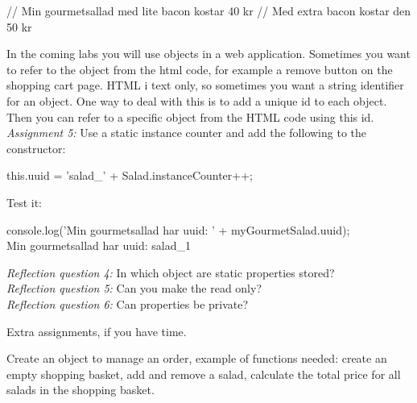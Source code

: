 \documentclass[fleqn, article, a4paper]{memoir}
\begin{document}
\begin{Assignments}
\begin{Code}
// Min gourmetsallad med lite bacon kostar 40 kr
// Med extra bacon kostar den 50 kr
\end{Code}

\item In the coming labs you will use  objects in a web application. Sometimes you want to refer to the object from the html code, for example a remove button on the shopping cart page. HTML i text only, so sometimes you want a string identifier for an object. One way to deal with this is to add a unique id to each  object. Then you can refer to a specific object from the HTML code using this id. 
\\\emph{Assignment 5:}
Use a static instance counter and add the following to the  constructor:
\begin{Code}
    this.uuid = 'salad_' + Salad.instanceCounter++;
\end{Code}
Test it:
\begin{Code}
console.log('Min gourmetsallad har uuid: ' + myGourmetSalad.uuid);
\\ Min gourmetsallad har uuid: salad_1
\end{Code}
\emph{Reflection question 4:} In which object are static properties stored?
\\\emph{Reflection question 5:} Can you make the  read only?
\\\emph{Reflection question 6:} Can properties be private?

\end{Assignments}

\noindent Extra assignments, if you have time.
\begin{Assignments}

\item Create an object to manage an order, example of functions needed: create an empty shopping basket, add and remove a salad, calculate the total price for all salads in the shopping basket.

\end{Assignments}


\end{document}
